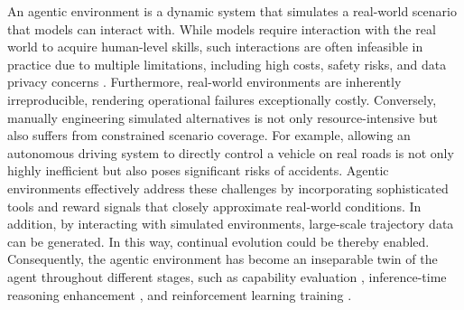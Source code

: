 \documentclass{llmxive}
\begin{document}


An agentic environment is a dynamic system that simulates a real-world scenario that models can interact with. While models require interaction with the real world to acquire human-level skills, such interactions are often infeasible in practice due to multiple limitations, including high costs, safety risks, and data privacy concerns \cite{Agent_world_model, RWKU, Troublemaker}. Furthermore, real-world environments are inherently irreproducible, rendering operational failures exceptionally costly. Conversely, manually engineering simulated alternatives is not only resource-intensive but also suffers from constrained scenario coverage. For example, allowing an autonomous driving system to directly control a vehicle on real roads is not only highly inefficient but also poses significant risks of accidents. Agentic environments effectively address these challenges by incorporating sophisticated tools and reward signals that closely approximate real-world conditions. In addition, by interacting with simulated environments, large-scale trajectory data can be generated. In this way, continual evolution could be thereby enabled. Consequently, the agentic environment has become an inseparable twin of the agent throughout different stages, such as capability evaluation \cite{DAComp, WebShop, SWE-Bench}, inference-time reasoning enhancement \cite{ReAct,Fixing_the_Broken_Compass,Omni-Reward}, and reinforcement learning training \cite{GRPO,DAPO,reinforce_internal,towards_agentic_llm}.

\end{document}
